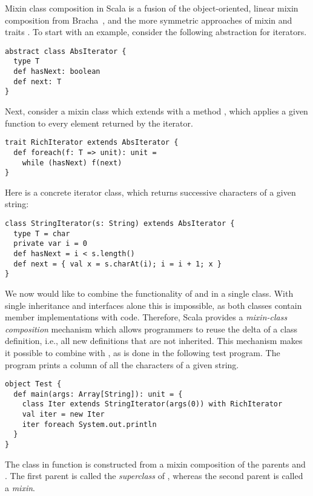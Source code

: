 \documentclass[a4paper,11pt,twoside]{article}
\begin{document}
Mixin class composition in Scala is a fusion of the object-oriented,
linear mixin composition from Bracha~\cite{bracha90mixinbased}, and
the more symmetric approaches of mixin
\cite{duggan96mixins,hirschowitz-leory:02mixin} and traits
\cite{schaerli03traits}.  To start with an example, consider the
following abstraction for iterators.
\begin{lstlisting}
abstract class AbsIterator {
  type T
  def hasNext: boolean
  def next: T
}
\end{lstlisting}
Next, consider a mixin class which extends \lstinline@AbsIterator@
with a method \lstinline@foreach@, which applies a given function to
every element returned by the iterator.
\begin{lstlisting}
trait RichIterator extends AbsIterator {
  def foreach(f: T => unit): unit = 
    while (hasNext) f(next)
}
\end{lstlisting}
Here is a concrete iterator class, which returns successive characters
of a given string:
\begin{lstlisting}
class StringIterator(s: String) extends AbsIterator {
  type T = char
  private var i = 0
  def hasNext = i < s.length()
  def next = { val x = s.charAt(i); i = i + 1; x }
}
\end{lstlisting}
We now would like to combine the functionality of
\lstinline@RichIterator@ and \lstinline@StringIterator@ in a single
class. With single inheritance and interfaces alone this is
impossible, as both classes contain member implementations with code.
Therefore,
Scala provides a \emph{mixin-class composition} mechanism which
allows programmers to reuse the delta of a class definition, i.e., all
new definitions that are not inherited. This mechanism makes it
possible to combine \lstinline@RichIterator@ with
\lstinline@StringIterator@, as is done in the following test program.
The program prints a column of all the characters of a given string.
\begin{lstlisting}
object Test {
  def main(args: Array[String]): unit = {
    class Iter extends StringIterator(args(0)) with RichIterator
    val iter = new Iter
    iter foreach System.out.println 
  }
}
\end{lstlisting}
The \lstinline@Iter@ class in function \lstinline@main@ is constructed
from a mixin composition of the parents \lstinline@StringIterator@ and
\lstinline@RichIterator@. The first parent is called the {\em
superclass} of \lstinline@Iter@, whereas the second parent is called a
{\em mixin}. 
\medskip
\end{document}
